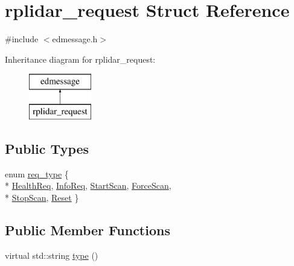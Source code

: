 \hypertarget{structrplidar__request}{\section{rplidar\-\_\-request Struct Reference}
\label{structrplidar__request}
}


{\ttfamily \#include $<$edmessage.\-h$>$}

Inheritance diagram for rplidar\-\_\-request\-:\begin{figure}[H]
\begin{center}
\leavevmode
\includegraphics[height=2.000000cm]{structrplidar__request}
\end{center}
\end{figure}
\subsection*{Public Types}
\begin{DoxyCompactItemize}
\item 
enum \hyperlink{structrplidar__request_a7a2aceb50d6779e0d0ca188d18542c75}{req\-\_\-type} \{ \\*
\hyperlink{structrplidar__request_a7a2aceb50d6779e0d0ca188d18542c75aec752da288a10cb540712a9910785b3d}{Health\-Req}, 
\hyperlink{structrplidar__request_a7a2aceb50d6779e0d0ca188d18542c75abc412c174f6810a858521f3bd5f136c9}{Info\-Req}, 
\hyperlink{structrplidar__request_a7a2aceb50d6779e0d0ca188d18542c75a9d7bdb72d07a35486c428690f36d1922}{Start\-Scan}, 
\hyperlink{structrplidar__request_a7a2aceb50d6779e0d0ca188d18542c75a8ee556fc213c3b12c7f2f938e8eb9a45}{Force\-Scan}, 
\\*
\hyperlink{structrplidar__request_a7a2aceb50d6779e0d0ca188d18542c75a490bbda14afdffd8124e436f67897405}{Stop\-Scan}, 
\hyperlink{structrplidar__request_a7a2aceb50d6779e0d0ca188d18542c75a8bb842fd26be4238785e41946562c5ff}{Reset}
 \}
\end{DoxyCompactItemize}
\subsection*{Public Member Functions}
\begin{DoxyCompactItemize}
\item 
virtual std\-::string \hyperlink{structrplidar__request_af5765bf9fe3d05e9642a255f3b9edfdc}{type} ()
\end{DoxyCompactItemize}
